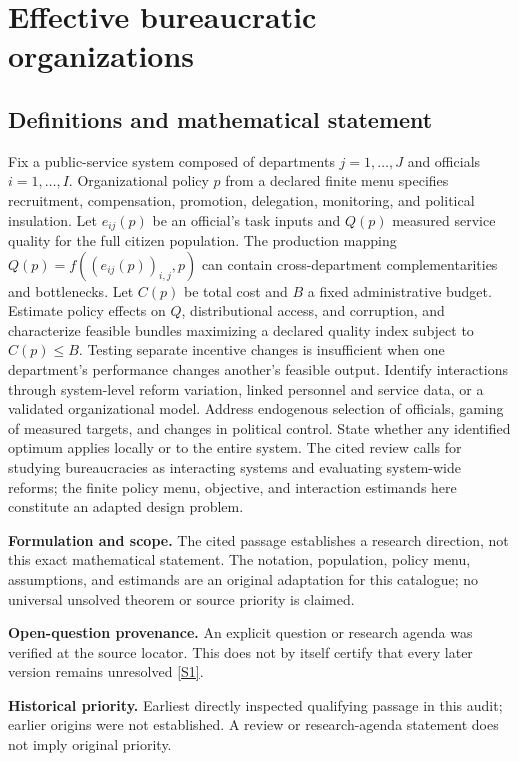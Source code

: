 \documentclass[11pt]{article}
\newcommand{\sref}[2]{\hyperlink{source:#1:#2}{[S#2]}}
\begin{document}
\section*{Effective bureaucratic organizations}\label{30007664}
\subsection{Definitions and mathematical statement}
Fix a public-service system composed of departments \(j=1,\ldots,J\) and officials \(i=1,\ldots,I\). Organizational policy \(p\) from a declared finite menu specifies recruitment, compensation, promotion, delegation, monitoring, and political insulation. Let \(e_{ij}(p)\) be an official's task inputs and \(Q(p)\) measured service quality for the full citizen population. The production mapping \(Q(p)=f((e_{ij}(p))_{i,j},p)\) can contain cross-department complementarities and bottlenecks. Let \(C(p)\) be total cost and \(B\) a fixed administrative budget. Estimate policy effects on \(Q\), distributional access, and corruption, and characterize feasible bundles maximizing a declared quality index subject to \(C(p)\le B\). Testing separate incentive changes is insufficient when one department's performance changes another's feasible output. Identify interactions through system-level reform variation, linked personnel and service data, or a validated organizational model. Address endogenous selection of officials, gaming of measured targets, and changes in political control. State whether any identified optimum applies locally or to the entire system. The cited review calls for studying bureaucracies as interacting systems and evaluating system-wide reforms; the finite policy menu, objective, and interaction estimands here constitute an adapted design problem.

\par\textbf{Formulation and scope.} The cited passage establishes a research direction, not this exact mathematical statement. The notation, population, policy menu, assumptions, and estimands are an original adaptation for this catalogue; no universal unsolved theorem or source priority is claimed.

\par\textbf{Open-question provenance.} An explicit question or research agenda was verified at the source locator. This does not by itself certify that every later version remains unresolved \sref{30007664}{1}.

\par\textbf{Historical priority.} Earliest directly inspected qualifying passage in this audit; earlier origins were not established. A review or research-agenda statement does not imply original priority.
\end{document}
